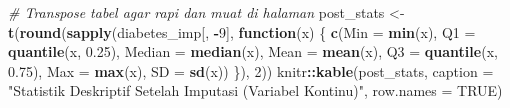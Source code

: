 \documentclass[
  11pt,
]{article}
\newenvironment{Shaded}{\begin{snugshade}}{\end{snugshade}}
\newcommand{\AttributeTok}[1]{\textcolor[rgb]{0.13,0.29,0.53}{#1}}
\newcommand{\CommentTok}[1]{\textcolor[rgb]{0.56,0.35,0.01}{\textit{#1}}}
\newcommand{\ConstantTok}[1]{\textcolor[rgb]{0.56,0.35,0.01}{#1}}
\newcommand{\ControlFlowTok}[1]{\textcolor[rgb]{0.13,0.29,0.53}{\textbf{#1}}}
\newcommand{\DecValTok}[1]{\textcolor[rgb]{0.00,0.00,0.81}{#1}}
\newcommand{\FloatTok}[1]{\textcolor[rgb]{0.00,0.00,0.81}{#1}}
\newcommand{\FunctionTok}[1]{\textcolor[rgb]{0.13,0.29,0.53}{\textbf{#1}}}
\newcommand{\NormalTok}[1]{#1}
\newcommand{\OtherTok}[1]{\textcolor[rgb]{0.56,0.35,0.01}{#1}}
\newcommand{\SpecialCharTok}[1]{\textcolor[rgb]{0.81,0.36,0.00}{\textbf{#1}}}
\newcommand{\StringTok}[1]{\textcolor[rgb]{0.31,0.60,0.02}{#1}}
\begin{document}
\begin{Shaded}
\begin{Highlighting}[]
\CommentTok{\# Transpose tabel agar rapi dan muat di halaman}
\NormalTok{post\_stats }\OtherTok{\textless{}{-}} \FunctionTok{t}\NormalTok{(}\FunctionTok{round}\NormalTok{(}\FunctionTok{sapply}\NormalTok{(diabetes\_imp[, }\SpecialCharTok{{-}}\DecValTok{9}\NormalTok{], }\ControlFlowTok{function}\NormalTok{(x) \{}
  \FunctionTok{c}\NormalTok{(}\AttributeTok{Min    =} \FunctionTok{min}\NormalTok{(x),}
    \AttributeTok{Q1     =} \FunctionTok{quantile}\NormalTok{(x, }\FloatTok{0.25}\NormalTok{),}
    \AttributeTok{Median =} \FunctionTok{median}\NormalTok{(x),}
    \AttributeTok{Mean   =} \FunctionTok{mean}\NormalTok{(x),}
    \AttributeTok{Q3     =} \FunctionTok{quantile}\NormalTok{(x, }\FloatTok{0.75}\NormalTok{),}
    \AttributeTok{Max    =} \FunctionTok{max}\NormalTok{(x),}
    \AttributeTok{SD     =} \FunctionTok{sd}\NormalTok{(x))}
\NormalTok{\}), }\DecValTok{2}\NormalTok{))}
\NormalTok{knitr}\SpecialCharTok{::}\FunctionTok{kable}\NormalTok{(post\_stats, }\AttributeTok{caption =} \StringTok{"Statistik Deskriptif Setelah Imputasi (Variabel Kontinu)"}\NormalTok{, }\AttributeTok{row.names =} \ConstantTok{TRUE}\NormalTok{)}
\end{Highlighting}
\end{Shaded}
\end{document}
